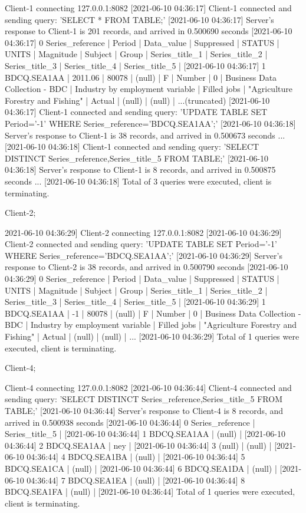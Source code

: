 \documentclass[a4paper]{article}
\begin{document}
\begin{textcode}
[2021-06-10 04:36:17] Client-1 connecting 127.0.0.1:8082
[2021-06-10 04:36:17] Client-1 connected and sending query: 'SELECT * FROM TABLE;'
[2021-06-10 04:36:17] Server's response to Client-1 is 201 records, and arrived in 0.500690 seconds
[2021-06-10 04:36:17] 0 Series_reference | Period | Data_value | Suppressed | STATUS | UNITS | Magnitude | Subject | Group | Series_title_1 | Series_title_2 | Series_title_3 | Series_title_4 | Series_title_5 | 
[2021-06-10 04:36:17] 1 BDCQ.SEA1AA | 2011.06 | 80078 | (null) | F | Number | 0 | Business Data Collection - BDC | Industry by employment variable | Filled jobs | "Agriculture Forestry and Fishing" | Actual | (null) | (null) | 
...(truncated)
[2021-06-10 04:36:17] Client-1 connected and sending query: 'UPDATE TABLE SET Period='-1' WHERE Series_reference='BDCQ.SEA1AA';'
[2021-06-10 04:36:18] Server's response to Client-1 is 38 records, and arrived in 0.500673 seconds
...
[2021-06-10 04:36:18] Client-1 connected and sending query: 'SELECT DISTINCT Series_reference,Series_title_5 FROM TABLE;'
[2021-06-10 04:36:18] Server's response to Client-1 is 8 records, and arrived in 0.500875 seconds
...
[2021-06-10 04:36:18] Total of 3 queries were executed, client is terminating.
\end{textcode}


Client-2;

\begin{textcode}
2021-06-10 04:36:29] Client-2 connecting 127.0.0.1:8082
[2021-06-10 04:36:29] Client-2 connected and sending query: 'UPDATE TABLE SET Period='-1' WHERE Series_reference='BDCQ.SEA1AA';'
[2021-06-10 04:36:29] Server's response to Client-2 is 38 records, and arrived in 0.500790 seconds
[2021-06-10 04:36:29] 0 Series_reference | Period | Data_value | Suppressed | STATUS | UNITS | Magnitude | Subject | Group | Series_title_1 | Series_title_2 | Series_title_3 | Series_title_4 | Series_title_5 | 
[2021-06-10 04:36:29] 1 BDCQ.SEA1AA | -1 | 80078 | (null) | F | Number | 0 | Business Data Collection - BDC | Industry by employment variable | Filled jobs | "Agriculture Forestry and Fishing" | Actual | (null) | (null) | 
...
[2021-06-10 04:36:29] Total of 1 queries were executed, client is terminating.
\end{textcode}

Client-4;

\begin{textcode}
[2021-06-10 04:36:44] Client-4 connecting 127.0.0.1:8082
[2021-06-10 04:36:44] Client-4 connected and sending query: 'SELECT DISTINCT Series_reference,Series_title_5 FROM TABLE;'
[2021-06-10 04:36:44] Server's response to Client-4 is 8 records, and arrived in 0.500938 seconds
[2021-06-10 04:36:44] 0 Series_reference | Series_title_5 | 
[2021-06-10 04:36:44] 1 BDCQ.SEA1AA | (null) | 
[2021-06-10 04:36:44] 2 BDCQ.SEA1AA | ney | 
[2021-06-10 04:36:44] 3 (null) | (null) | 
[2021-06-10 04:36:44] 4 BDCQ.SEA1BA | (null) | 
[2021-06-10 04:36:44] 5 BDCQ.SEA1CA | (null) | 
[2021-06-10 04:36:44] 6 BDCQ.SEA1DA | (null) | 
[2021-06-10 04:36:44] 7 BDCQ.SEA1EA | (null) | 
[2021-06-10 04:36:44] 8 BDCQ.SEA1FA | (null) | 
[2021-06-10 04:36:44] Total of 1 queries were executed, client is terminating.
\end{textcode}
\end{document}
